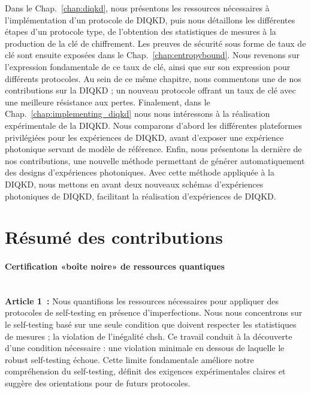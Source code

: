 \medbreak

Dans le Chap.~\ref{chap:diqkd}, nous présentons les ressources nécessaires à l'implémentation d'un protocole de DIQKD, puis nous détaillons les différentes étapes d'un protocole type, de l'obtention des statistiques de mesures à la production de la clé de chiffrement.
Les preuves de sécurité sous forme de taux de clé sont ensuite exposées dans le Chap.~\ref{chap:entropybound}. 
Nous revenons sur l'expression fondamentale de ce taux de clé, ainsi que sur son expression pour différents protocoles.
Au sein de ce même chapitre, nous commentons une de nos contributions sur la DIQKD ; un nouveau protocole offrant un taux de clé avec une meilleure résistance aux pertes.
Finalement, dans le Chap.~\ref{chap:implementing_diqkd} nous nous intéressons à la réalisation expérimentale de la DIQKD.
Nous comparons d'abord les différentes plateformes privilégiées pour les expé\-riences de DIQKD, avant d'exposer une expérience photonique servant de modèle de référence.
Enfin, nous présentons la dernière de nos contributions, une nouvelle méthode permettant de générer automatiquement des designs d'expériences photoniques.
Avec cette méthode appliquée à la DIQKD, nous mettons en avant deux nouveaux schémas d'expériences photoniques de DIQKD, facilitant la réalisation d'expériences de DIQKD.


\section{Résumé des contributions}

\paragraph{Certification «boîte noire» de ressources quantiques} \mbox{}\\

\textbf{Article 1~\cite{Valcarce2020}:} 
Nous quantifions les ressources nécessaires pour appliquer des protocoles de self-testing en présence d'imperfections.
Nous nous concentrons sur le self-testing basé sur une seule condition que doivent respecter les statistiques de mesures ; la violation de l'inégalité \acrshort{chsh}.
Ce travail conduit à la découverte d'une condition nécessaire : une violation minimale en dessous de laquelle le robust self-testing échoue.
Cette limite fondamentale améliore notre compréhension du self-testing, définit des exigences expérimentales claires et suggère des orientations pour de futurs protocoles.

